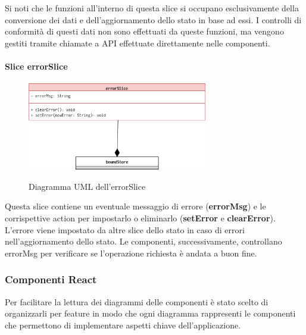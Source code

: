 Si noti che le funzioni all'interno di questa slice si occupano esclusivamente della conversione dei dati e dell'aggiornamento dello stato in base ad essi. I controlli di conformità di questi dati non sono effettuati da queste funzioni, ma vengono gestiti tramite chiamate a API effettuate direttamente nelle componenti.

\paragraph{Slice errorSlice}
\begin{figure}[H]
    \centering
    \includegraphics[width=0.7\textwidth]{images/UML/feature_model_errorSlice.drawio.png}
    \label{fig:UML_errorSlice}
    \caption{Diagramma UML dell'errorSlice}
\end{figure}
Questa slice contiene un eventuale messaggio di errore (\textbf{errorMsg}) e le corrispettive action per impostarlo o eliminarlo (\textbf{setError} e \textbf{clearError}). L'errore viene impostato da altre slice dello stato in caso di errori nell'aggiornamento dello stato. Le componenti, successivamente, controllano errorMsg per verificare se l'operazione richiesta è andata a buon fine.


\subsubsection{Componenti React}\label{sec:uml_react}
Per facilitare la lettura dei diagrammi delle componenti è stato scelto di organizzarli per feature in modo che ogni diagramma rappresenti le componenti che permettono di implementare aspetti chiave dell'applicazione.

